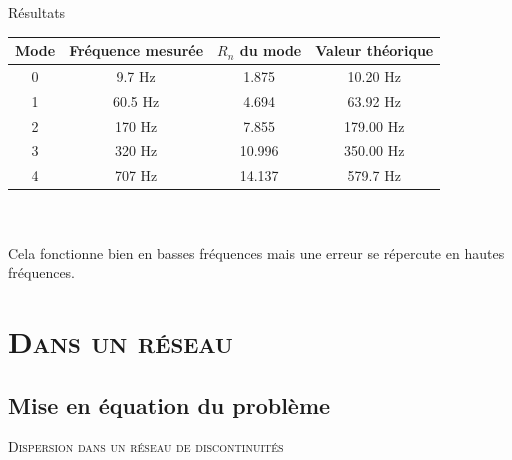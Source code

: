 \documentclass[xcolor=x11names,compress]{beamer}
\renewcommand{\(}{\begin{columns}}
\renewcommand{\)}{\end{columns}}
\newcommand{\<}[1]{\begin{column}{#1}}
\renewcommand{\>}{\end{column}}
\begin{document}
\begin{frame}{Résultats}
\bigskip
\begin{minipage}[c]{\textwidth}
\centering
\begin{tabular}[0.7]{c|c|c|c }
Mode & Fréquence mesurée  & $R_n$ du mode & Valeur théorique \\\hline
0 & 9.7 Hz & 1.875 & 10.20 Hz\\
1 & 60.5 Hz & 4.694 & 63.92 Hz\\
2 & 170 Hz & 7.855 & 179.00 Hz\\
3 & 320 Hz & 10.996 & 350.00 Hz\\
4 & 707 Hz & 14.137 & 579.7 Hz 
\end{tabular}
\end{minipage}\\~\\
Cela fonctionne bien en basses fréquences mais une erreur  se répercute en hautes fréquences.
\end{frame}


\section{\scshape Dans un réseau}
\subsection{Mise en équation du problème}
\begin{frame}
\large{{\scshape Dispersion dans un réseau de discontinuités}}
\end{frame}
\end{document}
